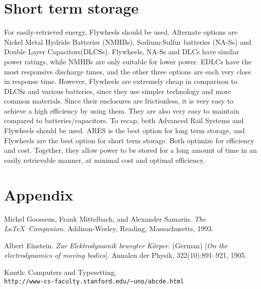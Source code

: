 \documentclass{article}
\begin{document}
\section{Short term storage}

For easily-retrieved energy, Flywheels should be used. Alternate options are Nickel Metal Hydride Batteries (NMHBs), Sodium-Sulfur batteries (NA-Ss) and Double Layer Capacitors(DLCSs). Flywheels, NA-Ss and DLCs have similar power ratings, while NMHBs are only suitable for lower power. EDLCs have the most responsive discharge times, and the other three options are each very close in response time. However, Flywheels are extremely cheap in comparison to DLCSs and various batteries, since they use simpler technology and more common materials. Since their enclosures are frictionless, it is very easy to achieve a high efficiency by using them. They are also very easy to maintain compared to batteries/capacitors.
To recap, both Advanced Rail Systems and Flywheels should be used. ARES is the best option for long term storage, and Flywheels are the best option for short term storage. Both optimize for efficiency and cost. Together, they allow power to be stored for a long amount of time in an easily retrievable manner, at minimal cost and optimal efficiency.

\section{Appendix}
\begin{thebibliography}{9}
        Michel Goossens, Frank Mittelbach, and Alexander Samarin. 
        \textit{The \LaTeX\ Companion}. 
        Addison-Wesley, Reading, Massachusetts, 1993.
         
        Albert Einstein. 
        \textit{Zur Elektrodynamik bewegter K{\"o}rper}. (German) 
        [\textit{On the electrodynamics of moving bodies}]. 
        Annalen der Physik, 322(10):891–921, 1905.
         
        Knuth: Computers and Typesetting,
        \\\texttt{http://www-cs-faculty.stanford.edu/\~{}uno/abcde.html}
\end{thebibliography}
\end{document}
